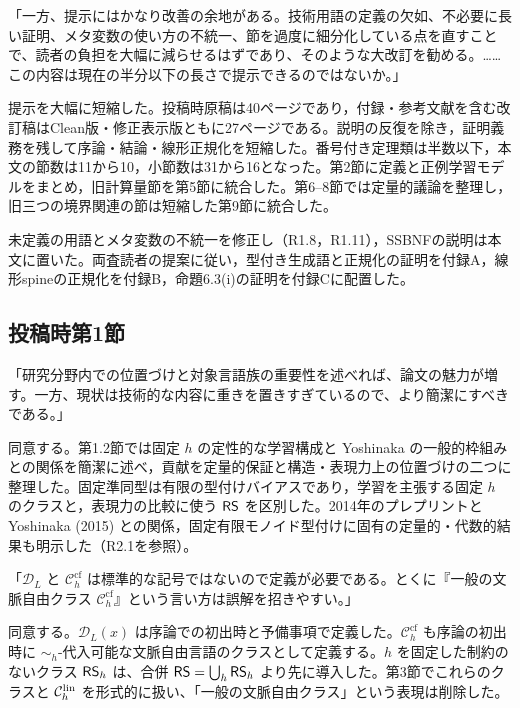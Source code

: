 「一方、提示にはかなり改善の余地がある。技術用語の定義の欠如、不必要に長い証明、メタ変数の使い方の不統一、節を過度に細分化している点を直すことで、読者の負担を大幅に減らせるはずであり、そのような大改訂を勧める。……この内容は現在の半分以下の長さで提示できるのではないか。」

\Reply
提示を大幅に短縮した。投稿時原稿は40ページであり，付録・参考文献を含む改訂稿はClean版・修正表示版ともに27ページである。説明の反復を除き，証明義務を残して序論・結論・線形正規化を短縮した。番号付き定理類は半数以下，本文の節数は11から10，小節数は31から16となった。第2節に定義と正例学習モデルをまとめ，旧計算量節を第5節に統合した。第6--8節では定量的議論を整理し，旧三つの境界関連の節は短縮した第9節に統合した。

未定義の用語とメタ変数の不統一を修正し（R1.8，R1.11），SSBNFの説明は本文に置いた。両査読者の提案に従い，型付き生成語と正規化の証明を付録A，線形spineの正規化を付録B，命題6.3(i)の証明を付録Cに配置した。

\subsection*{投稿時第1節}
「研究分野内での位置づけと対象言語族の重要性を述べれば、論文の魅力が増す。一方、現状は技術的な内容に重きを置きすぎているので、より簡潔にすべきである。」

\Reply
同意する。第1.2節では固定 $h$ の定性的な学習構成と Yoshinaka の一般的枠組みとの関係を簡潔に述べ，貢献を定量的保証と構造・表現力上の位置づけの二つに整理した。固定準同型は有限の型付けバイアスであり，学習を主張する固定 $h$ のクラスと，表現力の比較に使う $\mathsf{RS}$ を区別した。2014年のプレプリントと Yoshinaka (2015) との関係，固定有限モノイド型付けに固有の定量的・代数的結果も明示した（R2.1を参照）。

「$\mathcal D_L$ と $\mathcal C_h^{\mathrm{cf}}$ は標準的な記号ではないので定義が必要である。とくに『一般の文脈自由クラス $\mathcal C_h^{\mathrm{cf}}$』という言い方は誤解を招きやすい。」

\Reply
同意する。$\mathcal D_L(x)$ は序論での初出時と予備事項で定義した。$\mathcal C_h^{\mathrm{cf}}$ も序論の初出時に $\sim_h$-代入可能な文脈自由言語のクラスとして定義する。$h$ を固定した制約のないクラス $\mathsf{RS}_h$ は、合併 $\mathsf{RS}=\bigcup_h\mathsf{RS}_h$ より先に導入した。第3節でこれらのクラスと $\mathcal C_h^{\mathrm{lin}}$ を形式的に扱い、「一般の文脈自由クラス」という表現は削除した。

